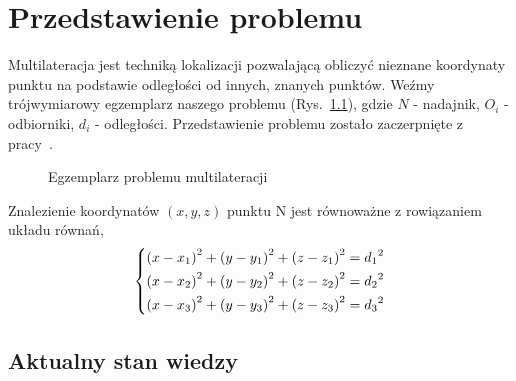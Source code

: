 \chapter{Przedstawienie problemu}\label{chap:problem}

Multilateracja jest techniką lokalizacji pozwalającą obliczyć nieznane koordynaty punktu na podstawie odległości od innych, znanych punktów. Weźmy trójwymiarowy egzemplarz naszego problemu (Rys.~\ref{fig:example}), gdzie $N$ - nadajnik, $O_i$ - odbiorniki, $d_i$ - odległości. Przedstawienie problemu zostało zaczerpnięte z pracy~\cite{norrdine2012algebraic}.

\begin{figure}[!h]
    \centering
    \caption{Egzemplarz problemu multilateracji}
\label{fig:example}
\end{figure}

Znalezienie koordynatów $(x,y,z)$ punktu N jest równoważne z rowiązaniem układu równań,
\begin{equation}\label{eq:base}
    \begin{dcases}
        {(x - x_1)}^2 + {(y - y_1)}^2 + {(z - z_1)}^2 = {d_1}^2\\
        {(x - x_2)}^2 + {(y - y_2)}^2 + {(z - z_2)}^2 = {d_2}^2\\
        {(x - x_3)}^2 + {(y - y_3)}^2 + {(z - z_3)}^2 = {d_3}^2\\
    \end{dcases}
\end{equation}

\section{Aktualny stan wiedzy}

